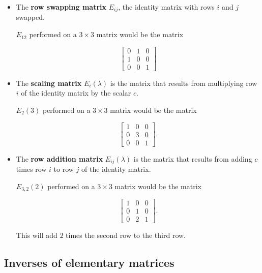 \documentclass{ximera}
\begin{document}
\begin{itemize}

  \item The \textbf{row swapping matrix} $E_{ij}$, the identity matrix with rows $i$ and $j$ swapped.
  
  $E_{12}$ performed on a $3\times 3$ matrix would be the matrix

  \begin{equation*}
    \begin{bmatrix}
      0 & 1 & 0 \\
      1 & 0 & 0 \\
      0 & 0 & 1
    \end{bmatrix}
  \end{equation*}

  \item The \textbf{scaling matrix} $E_{i}(\lambda)$ is the matrix that results from multiplying row $i$ of the identity matrix by the scalar $c$.
  
  $E_{2}(3)$ performed on a $3\times 3$ matrix would be the matrix

  \begin{equation*}
    \begin{bmatrix}
      1 & 0 & 0 \\
      0 & 3 & 0 \\
      0 & 0 & 1
    \end{bmatrix}.
  \end{equation*}

  \item The \textbf{row addition matrix} $E_{ij}(\lambda)$ is the matrix that results from adding $c$ times row $i$ to row $j$ of the identity matrix.
  
  $E_{3,2}(2)$ performed on a $3\times 3$ matrix would be the matrix

  \begin{equation*}
    \begin{bmatrix}
      1 & 0 & 0 \\
      0 & 1 & 0 \\
      0 & 2 & 1
    \end{bmatrix}.
  \end{equation*}

  This will add $2$ times the second row to the third row.

\end{itemize}

\subsection*{Inverses of elementary matrices}
\end{document}
